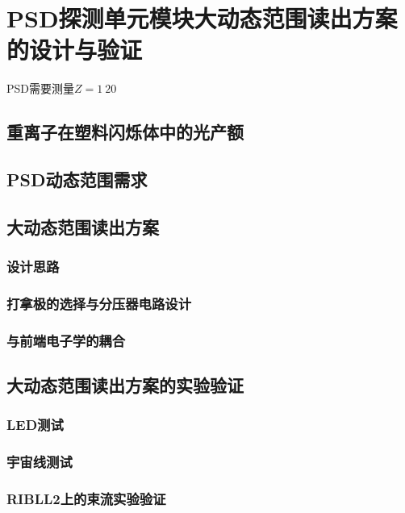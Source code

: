 \chapter{PSD探测单元模块大动态范围读出方案的设计与验证}
\label{ch:large_dynmaicrange}
PSD需要测量$Z=1~20$
\section{重离子在塑料闪烁体中的光产额}

\section{PSD动态范围需求}

\section{大动态范围读出方案}
\subsection{设计思路}
\subsection{打拿极的选择与分压器电路设计}
\subsection{与前端电子学的耦合}

\section{大动态范围读出方案的实验验证}
\subsection{LED测试}
\subsection{宇宙线测试}
\subsection{RIBLL2上的束流实验验证}